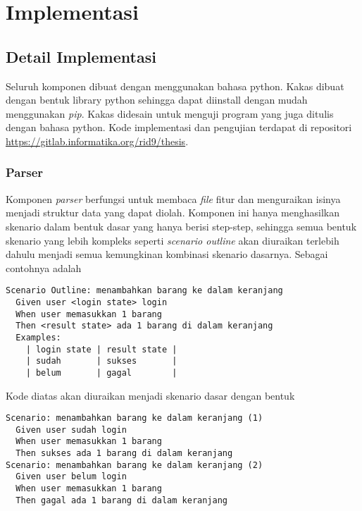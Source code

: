 \chapter{Implementasi}

\section{Detail Implementasi}

Seluruh komponen dibuat dengan menggunakan bahasa python. Kakas dibuat dengan bentuk library python
sehingga dapat diinstall dengan mudah menggunakan \emph{pip}. Kakas didesain untuk menguji
program yang juga ditulis dengan bahasa python. Kode implementasi dan pengujian terdapat
di repositori \\\url{https://gitlab.informatika.org/rid9/thesis}.

\subsection{Parser}

Komponen \emph{parser} berfungsi untuk membaca \emph{file} fitur dan menguraikan isinya menjadi
struktur data yang dapat diolah. Komponen ini hanya menghasilkan skenario dalam bentuk dasar
yang hanya berisi step-step, sehingga semua bentuk skenario yang lebih kompleks
seperti \emph{scenario outline} akan diuraikan terlebih dahulu menjadi semua kemungkinan
kombinasi skenario dasarnya. Sebagai contohnya adalah

\begin{lstlisting}[language=gherkin]
Scenario Outline: menambahkan barang ke dalam keranjang
  Given user <login state> login
  When user memasukkan 1 barang
  Then <result state> ada 1 barang di dalam keranjang
  Examples:
    | login state | result state |
    | sudah       | sukses       |
    | belum       | gagal        |
\end{lstlisting}

Kode diatas akan diuraikan menjadi skenario dasar dengan bentuk

\begin{lstlisting}[language=gherkin]
Scenario: menambahkan barang ke dalam keranjang (1)
  Given user sudah login
  When user memasukkan 1 barang
  Then sukses ada 1 barang di dalam keranjang
Scenario: menambahkan barang ke dalam keranjang (2)
  Given user belum login
  When user memasukkan 1 barang
  Then gagal ada 1 barang di dalam keranjang
\end{lstlisting}

